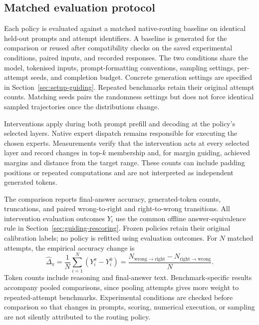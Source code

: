 \documentclass[12pt,a4paper,twoside,openright]{book}
\begin{document}
\subsection{Matched evaluation protocol}

Each policy is evaluated against a matched native-routing baseline on
identical held-out prompts and attempt identifiers. A baseline is generated
for the comparison or reused after compatibility checks on the saved
experimental conditions, paired inputs, and recorded responses. The two conditions
share the model, tokenised inputs, prompt-formatting conventions, sampling
settings, per-attempt seeds, and completion budget. Concrete generation
settings are specified in Section~\ref{sec:setup-guiding}. Repeated benchmarks
retain their original attempt counts. Matching seeds pairs the
randomness settings but does not force identical sampled trajectories once
the distributions change.

Interventions apply during both prompt prefill and decoding at the policy's
selected layers. Native expert dispatch remains responsible for executing
the chosen experts.
Measurements verify that the intervention acts at every selected layer and
record changes in top-$k$ membership and, for margin guiding, achieved margins and
distance from the target range. These counts can include padding positions
or repeated computations and are not interpreted as independent generated
tokens.

The comparison reports final-answer accuracy, generated-token counts,
truncations, and paired wrong-to-right and right-to-wrong transitions.
All intervention evaluation outcomes $Y_i$ use the common offline
answer-equivalence rule in Section~\ref{sec:guiding-rescoring}. Frozen
policies retain their original calibration labels; no policy is refitted
using evaluation outcomes. For
$N$ matched attempts, the empirical accuracy change is
\begin{equation}
  \widehat\Delta_{\pi}
  =\frac{1}{N}\sum_{i=1}^{N}
    \left(Y_i^{\pi}-Y_i^{0}\right)
  =\frac{N_{\mathrm{wrong\to right}}-
          N_{\mathrm{right\to wrong}}}{N}.
\end{equation}
Token counts include reasoning and final-answer text. Benchmark-specific
results accompany pooled comparisons, since pooling attempts gives more
weight to repeated-attempt benchmarks. Experimental conditions are checked before
comparison so that changes in prompts, scoring, numerical execution, or sampling are
not silently attributed to the routing policy.
\end{document}

